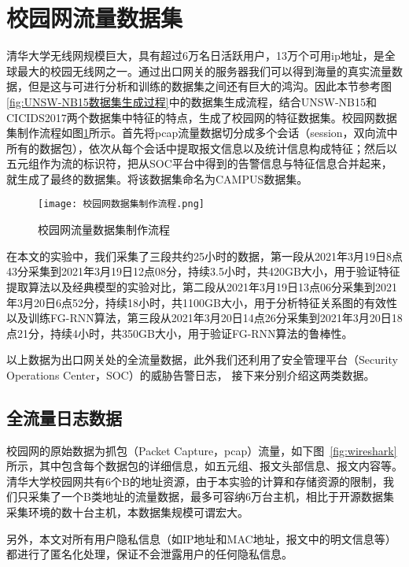 \section{校园网流量数据集}
清华大学无线网规模巨大，具有超过6万名日活跃用户，13万个可用ip地址，是全球最大的校园无线网之一。通过出口网关的服务器我们可以得到海量的真实流量数据，但是这与可进行分析和训练的数据集之间还有巨大的鸿沟。因此本节参考图\ref{fig:UNSW-NB15数据集生成过程}中的数据集生成流程，结合UNSW-NB15和CICIDS2017两个数据集中特征的特点，生成了校园网的特征数据集。校园网数据集制作流程如图\ref{fig:流量数据集制作流程}所示。首先将pcap流量数据切分成多个会话（session，双向流中所有的数据包），依次从每个会话中提取报文信息以及统计信息构成特征；然后以五元组作为流的标识符，把从SOC平台中得到的告警信息与特征信息合并起来，就生成了最终的数据集。将该数据集命名为CAMPUS数据集。
\begin{figure}
    \centering
    \texttt{[image: 校园网数据集制作流程.png]}
    \caption{校园网流量数据集制作流程}
    \label{fig:流量数据集制作流程}
  \end{figure}

在本文的实验中，我们采集了三段共约25小时的数据，第一段从2021年3月19日8点43分采集到2021年3月19日12点08分，持续3.5小时，共420GB大小，用于验证特征提取算法以及经典模型的实验对比，第二段从2021年3月19日13点06分采集到2021年3月20日6点52分，持续18小时，共1100GB大小，用于分析特征关系图的有效性以及训练FG-RNN算法，第三段从2021年3月20日14点26分采集到2021年3月20日18点21分，持续4小时，共350GB大小，用于验证FG-RNN算法的鲁棒性。

以上数据为出口网关处的全流量数据，此外我们还利用了安全管理平台（Security Operations Center，SOC）的威胁告警日志，
接下来分别介绍这两类数据。

\subsection{全流量日志数据}
校园网的原始数据为抓包（Packet Capture，pcap）流量，如下图~\ref{fig:wireshark}所示，其中包含每个数据包的详细信息，如五元组、报文头部信息、报文内容等。清华大学校园网共有6个B的地址资源，由于本实验的计算和存储资源的限制，我们只采集了一个B类地址的流量数据，最多可容纳6万台主机，相比于开源数据集采集环境的数十台主机，本数据集规模可谓宏大。

另外，本文对所有用户隐私信息（如IP地址和MAC地址，报文中的明文信息等）都进行了匿名化处理，保证不会泄露用户的任何隐私信息。

